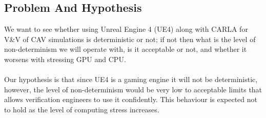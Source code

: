 \subsection{Problem And Hypothesis}
\noindent We want to see whether using Unreal Engine 4 (UE4) along with CARLA \cite{CARLA_paper} for V\&V of CAV simulations is deterministic or not; if not then what is the level of non-determinism we will operate with, is it acceptable or not, and whether it worsens with stressing GPU and CPU.\\\\
Our hypothesis is that since UE4 is a gaming engine it will not be deterministic, however, the level of non-determinism would be very low to acceptable limits that allows verification engineers to use it confidently.
This behaviour is expected not to hold as the level of computing stress increases.     


